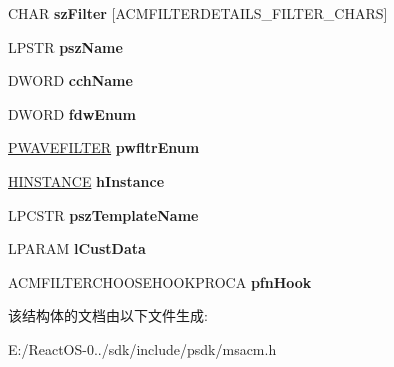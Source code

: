 \begin{DoxyCompactItemize}
\item 
\mbox{\label{structt_a_c_m_f_i_l_t_e_r_c_h_o_o_s_e_a_a5e7c84e186367f5281a88ea37f64279d}} 
C\+H\+AR {\bfseries sz\+Filter} \mbox{[}A\+C\+M\+F\+I\+L\+T\+E\+R\+D\+E\+T\+A\+I\+L\+S\+\_\+\+F\+I\+L\+T\+E\+R\+\_\+\+C\+H\+A\+RS\mbox{]}
\item 
\mbox{\label{structt_a_c_m_f_i_l_t_e_r_c_h_o_o_s_e_a_a46796712176d3447900272fd38c7f79f}} 
L\+P\+S\+TR {\bfseries psz\+Name}
\item 
\mbox{\label{structt_a_c_m_f_i_l_t_e_r_c_h_o_o_s_e_a_ad007325238505a92a0caa41db006d302}} 
D\+W\+O\+RD {\bfseries cch\+Name}
\item 
\mbox{\label{structt_a_c_m_f_i_l_t_e_r_c_h_o_o_s_e_a_aa48c116f2114b31f6b9981cd0fd9a778}} 
D\+W\+O\+RD {\bfseries fdw\+Enum}
\item 
\mbox{\label{structt_a_c_m_f_i_l_t_e_r_c_h_o_o_s_e_a_a1c9022c6e598c309f81d11a4a7cbaf0b}} 
\hyperlink{struct___w_a_v_e_f_i_l_t_e_r}{P\+W\+A\+V\+E\+F\+I\+L\+T\+ER} {\bfseries pwfltr\+Enum}
\item 
\mbox{\label{structt_a_c_m_f_i_l_t_e_r_c_h_o_o_s_e_a_ae9044a08d19184d09d7b2fd6a5e4f0ba}} 
\hyperlink{interfacevoid}{H\+I\+N\+S\+T\+A\+N\+CE} {\bfseries h\+Instance}
\item 
\mbox{\label{structt_a_c_m_f_i_l_t_e_r_c_h_o_o_s_e_a_afce5017307c305187e45c0fa0e051efe}} 
L\+P\+C\+S\+TR {\bfseries psz\+Template\+Name}
\item 
\mbox{\label{structt_a_c_m_f_i_l_t_e_r_c_h_o_o_s_e_a_a9bf5a72d5c46e931c402450770d239c1}} 
L\+P\+A\+R\+AM {\bfseries l\+Cust\+Data}
\item 
\mbox{\label{structt_a_c_m_f_i_l_t_e_r_c_h_o_o_s_e_a_acd663a6978b0f68a6dd64842558c00cb}} 
A\+C\+M\+F\+I\+L\+T\+E\+R\+C\+H\+O\+O\+S\+E\+H\+O\+O\+K\+P\+R\+O\+CA {\bfseries pfn\+Hook}
\end{DoxyCompactItemize}


该结构体的文档由以下文件生成\+:\begin{DoxyCompactItemize}
\item 
E\+:/\+React\+O\+S-\/0../sdk/include/psdk/msacm.\+h\end{DoxyCompactItemize}
